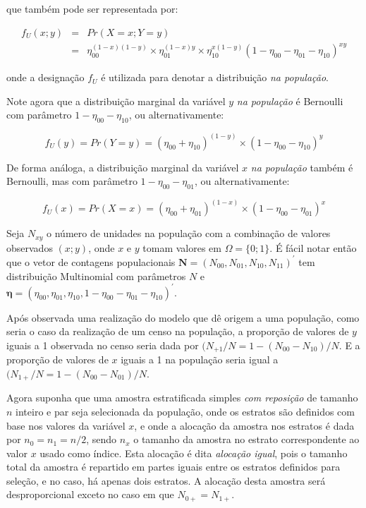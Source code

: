 \documentclass[]{book}
\numberwithin{example}{chapter}
\numberwithin{remark}{chapter}
\numberwithin{definition}{chapter}
\begin{document}
que também pode ser representada por:

\begin{eqnarray}
 f_U (x ; y) &=& Pr( X = x ; Y = y )\\
             & =& \eta_{00}^{(1-x)(1-y)} \times \eta_{01}^{(1-x)y} \times \eta_{10}^{x(1-y)} (1 - \eta_{00} - \eta_{01} - \eta_{10})^{xy} \nonumber
\end{eqnarray}

onde a designação \(f_U\) é utilizada para denotar a distribuição
\emph{na população}.

Note agora que a distribuição marginal da variável \(y\)
\emph{na população} é Bernoulli com parâmetro
\(1 - \eta_{00} - \eta_{10}\), ou alternativamente:

\begin{equation}
 f_U (y) = Pr( Y = y ) = (\eta_{00} + \eta_{10})^{(1-y)} \times (1 - \eta_{00} - \eta_{10})^y
\end{equation}

De forma análoga, a distribuição marginal da variável \(x\)
\emph{na população} também é Bernoulli, mas com parâmetro
\(1 - \eta_{00} - \eta_{01}\), ou alternativamente:

\begin{equation}
 f_U (x) = Pr( X = x ) = (\eta_{00} + \eta_{01})^{(1-x)} \times (1 - \eta_{00} - \eta_{01})^x
\end{equation}

Seja \(N_{xy}\) o número de unidades na população com a combinação de
valores observados \((x;y)\), onde \(x\) e \(y\) tomam valores em
\(\Omega = \{ 0 ; 1 \}\). É fácil notar então que o vetor de contagens
populacionais
\(\mathbf{N} = ( N_{00}, N_{01}, N_{10}, N_{11} )^{\prime}\) tem
distribuição Multinomial com parâmetros \(N\) e
\(\mathbf{\eta} = (\eta_{00} , \eta_{01} , \eta_{10} , 1 - \eta_{00} - \eta_{01} - \eta_{10} )^{\prime}\).

Após observada uma realização do modelo que dê origem a uma população,
como seria o caso da realização de um censo na população, a proporção de
valores de \(y\) iguais a 1 observada no censo seria dada por
\((N_{+1} / N = 1 - (N_{00} - N_{10})/N\). E a proporção de valores de
\(x\) iguais a 1 na população seria igual a
\((N_{1+} / N = 1 - (N_{00} - N_{01})/N\).

Agora suponha que uma amostra estratificada simples \emph{com reposição}
de tamanho \(n\) inteiro e par seja selecionada da população, onde os
estratos são definidos com base nos valores da variável \(x\), e onde a
alocação da amostra nos estratos é dada por \(n_0 = n_1 = n/2\), sendo
\(n_x\) o tamanho da amostra no estrato correspondente ao valor \(x\)
usado como índice. Esta alocação é dita \emph{alocação igual}, pois o
tamanho total da amostra é repartido em partes iguais entre os estratos
definidos para seleção, e no caso, há apenas dois estratos. A alocação
desta amostra será desproporcional exceto no caso em que
\(N_{0+} = N_{1+}\).
\end{document}
